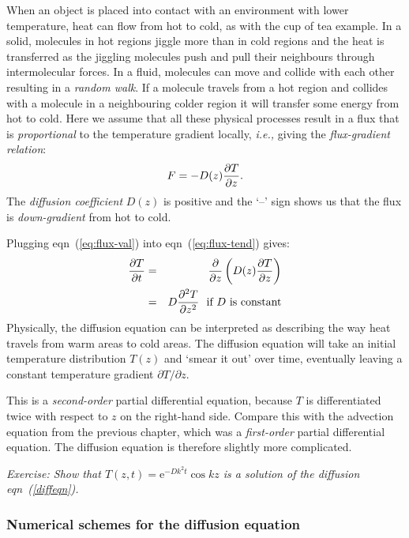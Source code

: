 When an object is placed into contact with an environment with lower
temperature, heat can flow from hot to cold, as with the cup of tea
example. In a solid, molecules in hot regions jiggle more than in cold
regions and the heat is transferred as the jiggling molecules push and
pull their neighbours through intermolecular forces. In a fluid,
molecules can move and collide with each other resulting in a {\em
	random walk}. If a molecule travels from a hot region and collides
with a molecule in a neighbouring colder region it will transfer some
energy from hot to cold. Here we
assume that all these physical processes result in a flux that is {\em
	proportional} to the temperature gradient locally, {\em i.e.,} giving
the {\em flux-gradient relation}:
\begin{equation}
	F = -D(z) \frac{\partial T}{\partial z}.
	\label{eq:flux-val}
\end{equation}
The {\em diffusion coefficient} $D(z)$ is positive and the `--' sign
shows us that the flux is {\em down-gradient} from hot to cold.

Plugging eqn~(\ref{eq:flux-val}) into eqn~(\ref{eq:flux-tend})
gives:
\begin{eqnarray}
	\frac{\partial T}{\partial t} & = & \frac{\partial }{\partial z} \left(
	D(z) \frac{\partial T}{\partial z}
	\right)		\\
	& = & D \frac{\partial ^{2}T}{\partial z^2}
	~~\mbox{if $D$ is constant}
	\label{diffeqn}
\end{eqnarray}
Physically, the diffusion equation can be interpreted as describing
the way heat travels from warm areas to cold areas. The diffusion
equation will take an initial temperature distribution $T(z)$ and
`smear it out' over time, eventually leaving a constant temperature
gradient $\partial T/\partial z$.

This is a \emph{second-order} partial differential
equation, because $T$ is differentiated twice with respect to $z$ on the 
right-hand side.  Compare this with the advection equation from the previous 
chapter, which was a \emph{first-order} partial differential equation.
The diffusion equation is therefore slightly more complicated.

{\em Exercise: Show that $T(z,t) = \mathrm{e}^{-D k^2 t} \cos kz$ is a
	solution of the diffusion eqn~(\ref{diffeqn}).}

\subsubsection{Numerical schemes for the diffusion equation}


